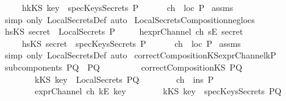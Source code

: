 \begin{isabellebody}
\ \ \ \ \ h{}{\isacharcolon}{\isachardoublequoteopen}kKS\ key\ {\isasymnotin}\ specKeysSecrets\ P{\isachardoublequoteclose}\isanewline
\ \ \ \ \ \ {\isachardoublequoteopen}ch\ {\isasymnotin}\ loc\ P{\isachardoublequoteclose}\isanewline
%
\isadelimproof
%
\endisadelimproof
%
\isatagproof
{}\isamarkupfalse%
\ assms\ \isamarkupfalse%
\ {\isacharparenleft}simp\ only{\isacharcolon}\ LocalSecretsDef{\isacharcomma}\ auto{\isacharparenright}%
\endisatagproof
{\isafoldproof}%
%
\isadelimproof
\isanewline
%
\endisadelimproof
\isanewline
{}\isamarkupfalse%
\ LocalSecretsComposition{\isacharunderscore}neg{\isacharunderscore}loc{\isacharunderscore}s{\isacharcolon}\isanewline
{}\ h{}{\isacharcolon}{\isachardoublequoteopen}sKS\ secret\ {\isasymnotin}\ LocalSecrets\ P{\isachardoublequoteclose}\isanewline
\ \ \ \ \ h{}{\isacharcolon}{\isachardoublequoteopen}exprChannel\ ch\ {\isacharparenleft}sE\ secret{\isacharparenright}{\isachardoublequoteclose}\isanewline
\ \ \ \ \ h{}{\isacharcolon}{\isachardoublequoteopen}sKS\ secret\ {\isasymnotin}\ specKeysSecrets\ P{\isachardoublequoteclose}\isanewline
\ \ \ \ \ \ {\isachardoublequoteopen}ch\ {\isasymnotin}\ loc\ P{\isachardoublequoteclose}\isanewline
%
\isadelimproof
%
\endisadelimproof
%
\isatagproof
{}\isamarkupfalse%
\ assms\ \isamarkupfalse%
\ {\isacharparenleft}simp\ only{\isacharcolon}\ LocalSecretsDef{\isacharcomma}\ auto{\isacharparenright}%
\endisatagproof
{\isafoldproof}%
%
\isadelimproof
\isanewline
%
\endisadelimproof
\isanewline
{}\isamarkupfalse%
\ correctCompositionKS{\isacharunderscore}exprChannel{\isacharunderscore}k{\isacharunderscore}P{\isacharcolon}\isanewline
{}\ {\isachardoublequoteopen}subcomponents\ PQ\ {\isacharequal}\ {\isacharbraceleft}P{\isacharcomma}Q{\isacharbraceright}{\isachardoublequoteclose}\ \isanewline
\ \ \ \ \ \ \ \ {\isachardoublequoteopen}correctCompositionKS\ PQ{\isachardoublequoteclose}\isanewline
\ \ \ \ \ \ \ \ {\isachardoublequoteopen}kKS\ key\ {\isasymnotin}\ LocalSecrets\ PQ{\isachardoublequoteclose}\isanewline
\ \ \ \ \ \ \ \ {\isachardoublequoteopen}ch\ {\isasymin}\ ins\ P{\isachardoublequoteclose}\isanewline
\ \ \ \ \ \ \ \ {\isachardoublequoteopen}exprChannel\ ch\ {\isacharparenleft}kE\ key{\isacharparenright}{\isachardoublequoteclose}\isanewline
\ \ \ \ \ \ \ \ {\isachardoublequoteopen}kKS\ key\ {\isasymnotin}\ specKeysSecrets\ PQ{\isachardoublequoteclose}\isanewline

\end{isabellebody}
